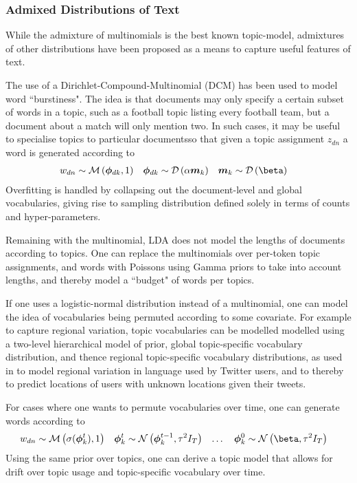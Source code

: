 

\subsubsection{Admixed Distributions of Text}

While the admixture of multinomials is the best known topic-model, admixtures of other distributions have been proposed as a means to capture useful features of text. 

The use of a Dirichlet-Compound-Multinomial (DCM) has been used to model word ``burstiness"\cite{Madsen2005}. The idea is that documents may only specify a certain subset of words in a topic, such as a football topic listing every football team, but a document about a match will only mention two. In such cases, it may be useful to specialise topics to particular documentsso  that given a topic assignment $z_{dn}$ a word is generated according to
\begin{align}
w_{dn} & \sim \muln{\vv{\phi}_{dk}}{1} &
\vv{\phi}_{dk} & \sim \dir{\alpha \vv{m}_k} &
\vv{m}_k & \sim \dir{\vv{\beta}}
\end{align}
Overfitting is handled by collapsing out the document-level and global vocabularies, giving rise to sampling distribution defined solely in terms of counts and hyper-parameters. 

Remaining with the multinomial, LDA does not model the lengths of documents according to topics. One can replace the multinomials over per-token topic assignments, and words with Poissons using Gamma priors to take into account lengths, and thereby model a ``budget" of words per topics\cite{Gopalan2013}. 

If one uses a logistic-normal distribution instead of a multinomial, one can model the idea of vocabularies being permuted according to some covariate. For example to capture regional variation, topic vocabularies can be modelled modelled using a two-level hierarchical model of prior, global topic-specific vocabulary distribution, and thence regional topic-specific vocabulary distributions, as used in \cite{Eisenstein2010} to model regional variation in language used by Twitter users, and to thereby to predict locations of users with unknown locations given their tweets.

For cases where one wants to permute vocabularies over time, one can generate words according to
\begin{align}
w_{dn} & \sim \muln{\sigma(\vv{\phi}_k^t)}{1} &
\vv{\phi}_k^t & \sim \nor{\vv{\phi}_k^{t-1}}{\tau^2 I_T} & \ldots\quad
\vv{\phi}_k^0 & \sim \nor{\vv{\beta}}{\tau^2 I_T}
\end{align}
Using the same prior over topics, one can derive a topic model that allows for drift over topic usage and topic-specific vocabulary over time\cite{Blei2006a}. 

